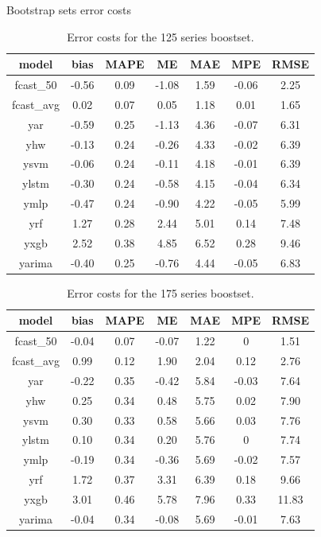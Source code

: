 \documentclass[ijoc,sglanonrev]{informs4}
\begin{document}
\begin{APPENDIX}{Bootstrap sets error costs}
\begin{table}
\centering
\renewcommand{\arraystretch}{0.75}
\begin{tabular}{ccccccc}
model & bias & MAPE & ME & MAE & MPE & RMSE \\
\hline
fcast\_50   & -0.56 & 0.09 & -1.08 & 1.59 & -0.06 & 2.25  \\
fcast\_avg  &  0.02 & 0.07 &  0.05 & 1.18 &  0.01 & 1.65  \\
yar         & -0.59 & 0.25 & -1.13 & 4.36 & -0.07 & 6.31  \\
yhw         & -0.13 & 0.24 & -0.26 & 4.33 & -0.02 & 6.39  \\
ysvm        & -0.06 & 0.24 & -0.11 & 4.18 & -0.01 & 6.39  \\
ylstm       & -0.30 & 0.24 & -0.58 & 4.15 & -0.04 & 6.34  \\
ymlp        & -0.47 & 0.24 & -0.90 & 4.22 & -0.05 & 5.99  \\
yrf         &  1.27 & 0.28 &  2.44 & 5.01 &  0.14 & 7.48  \\
yxgb        &  2.52 & 0.38 &  4.85 & 6.52 &  0.28 & 9.46  \\
yarima      & -0.40 & 0.25 & -0.76 & 4.44 & -0.05 & 6.83  \\
\hline
\end{tabular}
\caption{Error costs for the 125 series boostset.}
\label{table:app125}
\end{table}

\begin{table}
\centering
\renewcommand{\arraystretch}{0.75}
\begin{tabular}{ccccccc}
model & bias & MAPE & ME & MAE & MPE & RMSE \\
\hline
fcast\_50  & -0.04 & 0.07 & -0.07 & 1.22 & 0     & 1.51 \\
fcast\_avg & 0.99  & 0.12 & 1.90  & 2.04 & 0.12  & 2.76 \\
yar        & -0.22 & 0.35 & -0.42 & 5.84 & -0.03 & 7.64 \\
yhw        & 0.25  & 0.34 & 0.48  & 5.75 & 0.02  & 7.90 \\
ysvm       & 0.30  & 0.33 & 0.58  & 5.66 & 0.03  & 7.76 \\
ylstm      & 0.10  & 0.34 & 0.20  & 5.76 & 0     & 7.74 \\
ymlp       & -0.19 & 0.34 & -0.36 & 5.69 & -0.02 & 7.57 \\
yrf        & 1.72  & 0.37 & 3.31  & 6.39 & 0.18  & 9.66 \\
yxgb       & 3.01  & 0.46 & 5.78  & 7.96 & 0.33  & 11.83\\
yarima     & -0.04 & 0.34 & -0.08 & 5.69 & -0.01 & 7.63 \\
\hline
\end{tabular}
\caption{Error costs for the 175 series boostset.}
\label{table:app175}
\end{table}
\end{APPENDIX}
\end{document}
